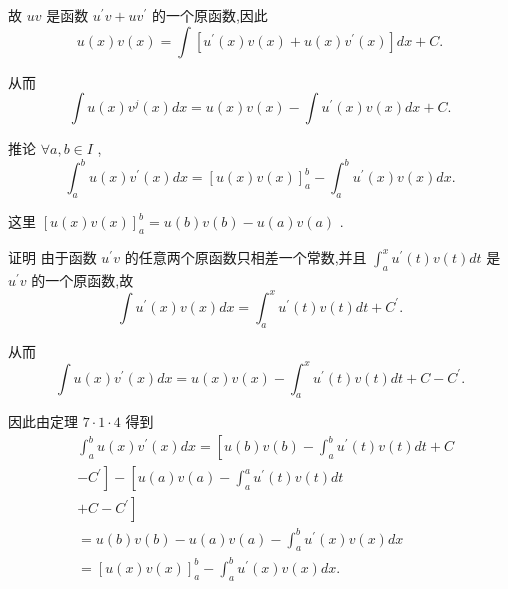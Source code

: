 故 ${uv}$ 是函数 ${u}^{\prime }v + u{v}^{\prime }$ 的一个原函数,因此
$$u\left( x\right) v\left( x\right)  = \int \left\lbrack  {{u}^{\prime }\left( x\right) v\left( x\right)  + u\left( x\right) {v}^{\prime }\left( x\right) }\right\rbrack  {dx} + C.$$

从而
$$\int u\left( x\right) {v}^{j}\left( x\right) {dx} = u\left( x\right) v\left( x\right)  - \int {u}^{\prime }\left( x\right) v\left( x\right) {dx} + C.$$

推论 $\forall a,b \in  I$ ,
$${\int }_{a}^{b}u\left( x\right) {v}^{\prime }\left( x\right) {dx} = {\left\lbrack  u\left( x\right) v\left( x\right) \right\rbrack  }_{a}^{b} - {\int }_{a}^{b}{u}^{\prime }\left( x\right) v\left( x\right) {dx}.$$

这里 ${\left\lbrack  u\left( x\right) v\left( x\right) \right\rbrack  }_{a}^{b} = u\left( b\right) v\left( b\right)  - u\left( a\right) v\left( a\right)$ .

证明 由于函数 ${u}^{\prime }v$ 的任意两个原函数只相差一个常数,并且 ${\int }_{a}^{x}{u}^{\prime }\left( t\right) v\left( t\right) {dt}$ 是 ${u}^{\prime }v$ 的一个原函数,故
$$\int {u}^{\prime }\left( x\right) v\left( x\right) {dx} = {\int }_{a}^{x}{u}^{\prime }\left( t\right) v\left( t\right) {dt} + {C}^{\prime }.$$

从而
$$\int u\left( x\right) {v}^{\prime }\left( x\right) {dx} = u\left( x\right) v\left( x\right)  - {\int }_{a}^{x}{u}^{\prime }\left( t\right) v\left( t\right) {dt} + C - {C}^{\prime }.$$

因此由定理 $7 \cdot  1 \cdot  4$ 得到
\begin{align*}
	&{\int }_{a}^{b}u\left( x\right) {v}^{\prime }\left( x\right) {dx} = \left\lbrack  {u\left( b\right) v\left( b\right)  - {\int }_{a}^{b}{u}^{\prime }\left( t\right) v\left( t\right) {dt} + C}\right.\\
	&\left. {-{C}^{\prime }}\right\rbrack   - \left\lbrack  {u\left( a\right) v\left( a\right)  - {\int }_{a}^{a}{u}^{\prime }\left( t\right) v\left( t\right) {dt}}\right.\\
	&\left. {+C - {C}^{\prime }}\right\rbrack\\
	&= u\left( b\right) v\left( b\right)  - u\left( a\right) v\left( a\right)  - {\int }_{a}^{b}{u}^{\prime }\left( x\right) v\left( x\right) {dx}\\
	&= {\left\lbrack  u\left( x\right) v\left( x\right) \right\rbrack  }_{a}^{b} - {\int }_{a}^{b}{u}^{\prime }\left( x\right) v\left( x\right) {dx}.
\end{align*}

